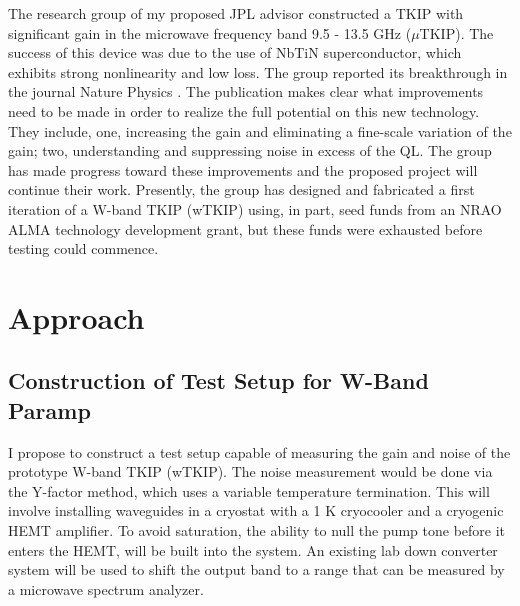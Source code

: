 The research group of my proposed JPL advisor constructed a TKIP with significant gain in the microwave frequency band 9.5 - 13.5 GHz ($\mu$TKIP). The success of this  device was due to the use of  NbTiN superconductor, which exhibits strong nonlinearity and low loss. The group reported its breakthrough in the journal Nature Physics \cite{Eom2012}. The publication makes clear what improvements need to be made in order to realize the full potential on this new technology. They include, one, increasing the  gain and eliminating a fine-scale variation of the gain; two, understanding and suppressing noise in excess of the QL. The group has made progress toward these improvements and the proposed  project will continue their work.  Presently, the group has designed and fabricated a first iteration of a W-band TKIP (wTKIP) using, in part, seed funds from an NRAO ALMA technology development grant, but these funds were exhausted before testing could commence. 


%
%
%


\section*{Approach}
\subsection*{Construction of Test Setup for W-Band Paramp}
I propose to construct a test setup capable of measuring the gain and noise of the prototype W-band TKIP (wTKIP). The noise measurement would be done via the Y-factor method, which uses a variable temperature termination. This will involve installing waveguides in a cryostat with a 1 K cryocooler and a cryogenic HEMT amplifier. To avoid saturation, the ability to null the pump tone before it enters the HEMT, will be built into the system. An existing lab down converter system will be used to shift the output band to a range that can be measured by a microwave spectrum analyzer.


